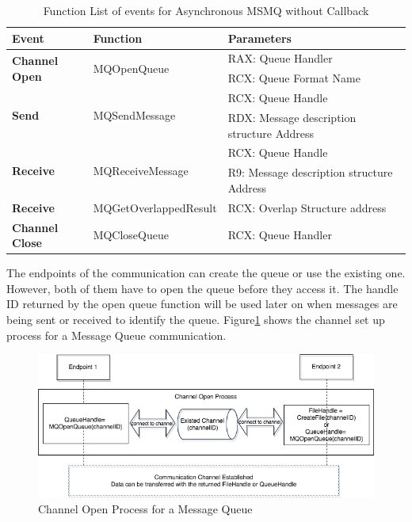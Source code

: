     \begin{table}[H]
        \centering
        \caption{Function List  of events for Asynchronous MSMQ without Callback}
        \label{msmqasynfunctions}
        \begin{tabular}{|l|l|l|}
            \hline
             \textbf{Event} & \textbf{Function}& \textbf{Parameters}  \\
             \hline
             \multirow{2}{*}{{\textbf{Channel Open}}}
             &\multirow{2}{*}{{MQOpenQueue}} &  RAX: Queue Handler\\
              \cline{3-3} 
             & &  RCX: Queue Format Name\\
            \hline
             \multirow{2}{*}{{\textbf{Send}}}
             &\multirow{2}{*}{MQSendMessage} &  RCX: Queue Handle \\
              \cline{3-3} 
             &&  RDX: Message description structure Address \\
            \hline
             \multirow{2}{*}{{\textbf{Receive}}}
             & \multirow{2}{*}{MQReceiveMessage}&  RCX: Queue Handle \\
              \cline{3-3} 
              &&  R9: Message description structure Address \\
              \hline
              \textbf{Receive} 
              & MQGetOverlappedResult &  RCX: Overlap Structure address  \\
            \hline
            \textbf{Channel Close} &MQCloseQueue & RCX: Queue Handler \\
            \hline
        \end{tabular}
    \end{table}
    
The endpoints of the communication can create the queue or use the existing one. However, both of them have to open the queue before they access it. The handle ID returned by the open queue function will be used later on when messages are being sent or received to identify the queue. Figure\ref{msmqopen} shows the channel set up process for a Message Queue communication.
\begin{figure}[H]
\centerline{\includegraphics[scale=0.55]{Figures/msmqchannelopen}}
 \caption{Channel Open Process for a Message Queue}
\label{msmqopen}
\end{figure}
    
